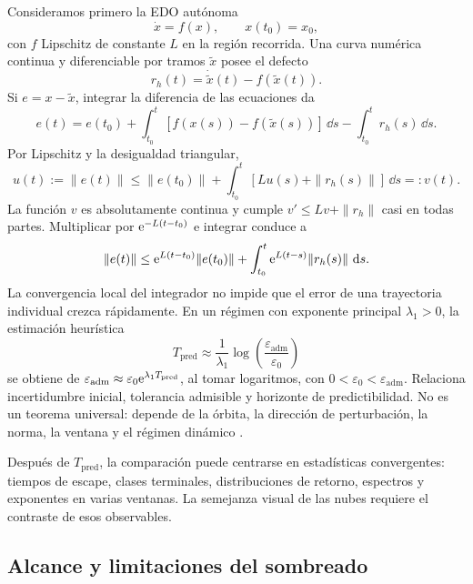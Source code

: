 Consideramos primero la EDO autónoma
\begin{equation}
 \dot x=f(x),\qquad x(t_0)=x_0,
 \label{eq:reliability-ode}
\end{equation}
con \(f\) Lipschitz de constante \(L\) en la región recorrida. Una curva
numérica continua y diferenciable por tramos \(\widetilde x\) posee el defecto
\begin{equation}
 r_h(t)=\dot{\widetilde x}(t)-f(\widetilde x(t)).
 \label{eq:reliability-defect}
\end{equation}
Si \(e=x-\widetilde x\), integrar la diferencia de las ecuaciones da
\[
 e(t)=e(t_0)+\int_{t_0}^t[f(x(s))-f(\widetilde x(s))]\,\dd s
                  -\int_{t_0}^tr_h(s)\,\dd s.
\]
Por Lipschitz y la desigualdad triangular,
\[
 u(t):=\|e(t)\|\leq\|e(t_0)\|
            +\int_{t_0}^t[Lu(s)+\|r_h(s)\|]\,\dd s=:v(t).
\]
La función \(v\) es absolutamente continua y cumple
\(v'\leq Lv+\|r_h\|\) casi en todas partes. Multiplicar por
\(\mathrm e^{-L(t-t_0)}\) e integrar conduce a
\begin{equation}
 \|e(t)\|
 \leq \mathrm e^{L(t-t_0)}\|e(t_0)\|
 +\int_{t_0}^{t}\mathrm e^{L(t-s)}\|r_h(s)\|\,\,\mathrm d s .
 \label{eq:reliability-gronwall}
\end{equation}
La convergencia local del integrador no impide que el error de una trayectoria
individual crezca rápidamente. En un régimen con exponente principal
\(\lambda_1>0\), la estimación heurística
\begin{equation}
 T_{\mathrm{pred}}
 \approx\frac{1}{\lambda_1}
 \log\!\left(\frac{\varepsilon_{\mathrm{adm}}}
                   {\varepsilon_0}\right)
 \label{eq:reliability-predictability-horizon}
\end{equation}
se obtiene de \(\varepsilon_{\mathrm{adm}}\approx
\varepsilon_0\mathrm e^{\lambda_1T_{\mathrm{pred}}}\), al tomar logaritmos, con
\(0<\varepsilon_0<\varepsilon_{\mathrm{adm}}\). Relaciona incertidumbre
inicial, tolerancia admisible y horizonte de predictibilidad. No es un teorema universal: depende de la órbita,
la dirección de perturbación, la norma, la ventana y el régimen dinámico
\cite{VallejoSanjuan2017Predictability}.

Después de \(T_{\mathrm{pred}}\), la comparación puede centrarse en
estadísticas convergentes: tiempos de escape, clases terminales,
distribuciones de retorno, espectros y exponentes en varias ventanas. La
semejanza visual de las nubes requiere el contraste de esos observables.

\subsection{Alcance y limitaciones del sombreado}

